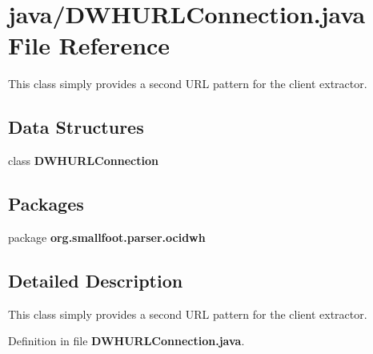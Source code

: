 \section{java/\+D\+W\+H\+U\+R\+L\+Connection.java File Reference}
\label{DWHURLConnection_8java}


This class simply provides a second U\+R\+L pattern for the client extractor.  


\subsection*{Data Structures}
\begin{DoxyCompactItemize}
\item 
class {\bf D\+W\+H\+U\+R\+L\+Connection}
\end{DoxyCompactItemize}
\subsection*{Packages}
\begin{DoxyCompactItemize}
\item 
package {\bf org.\+smallfoot.\+parser.\+ocidwh}
\end{DoxyCompactItemize}


\subsection{Detailed Description}
This class simply provides a second U\+R\+L pattern for the client extractor. 



Definition in file {\bf D\+W\+H\+U\+R\+L\+Connection.\+java}.

